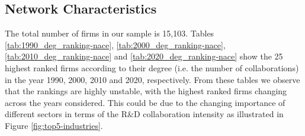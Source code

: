 \subsection{Network Characteristics}
\label{sec:net-char}
The total number of firms in our sample is 15,103. Tables  \ref{tab:1990_deg_ranking-nace}, \ref{tab:2000_deg_ranking-nace},  \ref{tab:2010_deg_ranking-nace} and  \ref{tab:2020_deg_ranking-nace} show the 25 highest ranked firms according to their degree (i.e. the number of collaborations) in the year 1990, 2000, 2010 and 2020, respectively. From these tables we observe that the rankings are highly unstable, with the highest ranked firms changing across the years considered. This could be due to the changing importance of different sectors in terms of the R\&D collaboration intensity as illustrated in Figure \ref{fig:top5-industries}.


